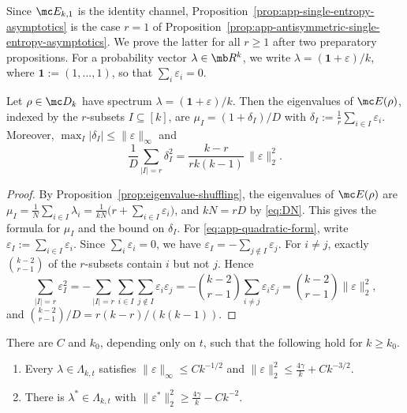 Since \(\mc E_{k,1}\) is the identity channel,
Proposition~\ref{prop:app-single-entropy-asymptotics} is the case
\(r=1\) of
Proposition~\ref{prop:app-antisymmetric-single-entropy-asymptotics}.
We prove the latter for all \(r\geq1\) after two preparatory
propositions.  For a probability vector \(\lambda\in\mb R^k\), we write
\(\lambda=(\mathbf1+\varepsilon)/k\), where \(\mathbf1:=(1,\ldots,1)\), so
that \(\sum_i\varepsilon_i=0\).
 
\begin{proposition}
\label{prop:app-shuffled-spectrum}
Let \(\rho\in\mc D_k\) have spectrum \(\lambda=(\mathbf1+\varepsilon)/k\).
Then the eigenvalues of \(\mc E(\rho)\), indexed by the \(r\)-subsets
\(I\subseteq[k]\), are \(\mu_I=(1+\delta_I)/D\) with
\(\delta_I:=\frac1r\sum_{i\in I}\varepsilon_i\).  Moreover,
\(\max_I|\delta_I|\le\|\varepsilon\|_\infty\) and
\begin{equation}
    \frac1D\sum_{|I|=r}\delta_I^2
    =\frac{k-r}{rk(k-1)}\,\|\varepsilon\|_2^2.
    \label{eq:app-quadratic-form}
\end{equation}
\end{proposition}
 
\begin{proof}
By Proposition~\ref{prop:eigenvalue-shuffling}, the eigenvalues of
\(\mc E(\rho)\) are
\(\mu_I=\frac1N\sum_{i\in I}\lambda_i=\frac1{kN}\bigl(r+\sum_{i\in I}\varepsilon_i\bigr)\),
and \(kN=rD\) by \eqref{eq:DN}.  This gives the formula for \(\mu_I\) and
the bound on \(\delta_I\).  For \eqref{eq:app-quadratic-form}, write
\(\varepsilon_I:=\sum_{i\in I}\varepsilon_i\).  Since
\(\sum_i\varepsilon_i=0\), we have
\(\varepsilon_I=-\sum_{j\notin I}\varepsilon_j\).  For \(i\neq j\),
exactly \(\binom{k-2}{r-1}\) of the \(r\)-subsets contain \(i\) but not
\(j\).  Hence
\begin{equation}
    \sum_{|I|=r}\varepsilon_I^2
    =-\sum_{|I|=r}\sum_{i\in I}\sum_{j\notin I}\varepsilon_i\varepsilon_j
    =-\binom{k-2}{r-1}\sum_{i\neq j}\varepsilon_i\varepsilon_j
    =\binom{k-2}{r-1}\|\varepsilon\|_2^2,
\end{equation}
and \(\binom{k-2}{r-1}/D=r(k-r)/(k(k-1))\).
\end{proof}
 
\begin{proposition}
\label{prop:app-localization}
There are \(C\) and \(k_0\), depending only on \(t\), such that the
following hold for \(k\ge k_0\).
\begin{enumerate}[label=\textup{(\roman*)}]
\item Every \(\lambda\in\Lambda_{k,t}\) satisfies
\(\|\varepsilon\|_\infty\le Ck^{-1/2}\) and
\(\|\varepsilon\|_2^2\le\frac{4\gamma}k+Ck^{-3/2}\).
\item There is \(\lambda^*\in\Lambda_{k,t}\) with
\(\|\varepsilon^*\|_2^2\ge\frac{4\gamma}k-Ck^{-2}\).
\end{enumerate}
\end{proposition}
 
